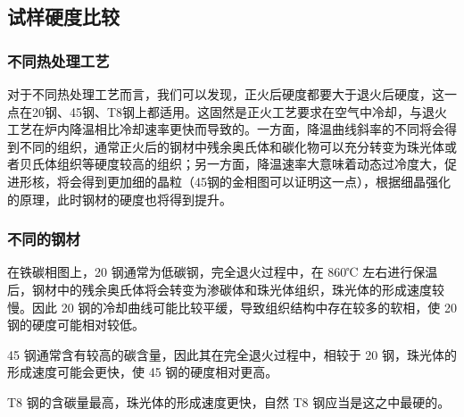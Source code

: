 \documentclass[a4paper,utf8]{article}
\begin{document}
\begin{figure}[!ht]
             \hspace{30pt}
        \end{figure}
    \subsection{试样硬度比较}
        \subsubsection{不同热处理工艺}
            对于不同热处理工艺而言，我们可以发现，正火后硬度都要大于退火后硬度，这一点在20钢、45钢、T8钢上都适用。这固然是正火工艺要求在空气中冷却，与退火工艺在炉内降温相比冷却速率更快而导致的。一方面，降温曲线斜率的不同将会得到不同的组织，通常正火后的钢材中残余奥氏体和碳化物可以充分转变为珠光体或者贝氏体组织等硬度较高的组织；另一方面，降温速率大意味着动态过冷度大，促进形核，将会得到更加细的晶粒（45钢的金相图可以证明这一点），根据细晶强化的原理，此时钢材的硬度也将得到提升。
        \subsubsection{不同的钢材}
            在铁碳相图上，20 钢通常为低碳钢，完全退火过程中，在 860℃ 左右进行保温后，钢材中的残余奥氏体将会转变为渗碳体和珠光体组织，珠光体的形成速度较慢。因此 20 钢的冷却曲线可能比较平缓，导致组织结构中存在较多的软相，使 20 钢的硬度可能相对较低。\par
            45 钢通常含有较高的碳含量，因此其在完全退火过程中，相较于 20 钢，珠光体的形成速度可能会更快，使 45 钢的硬度相对更高。\par
            T8 钢的含碳量最高，珠光体的形成速度更快，自然 T8 钢应当是这之中最硬的。
\end{document}
